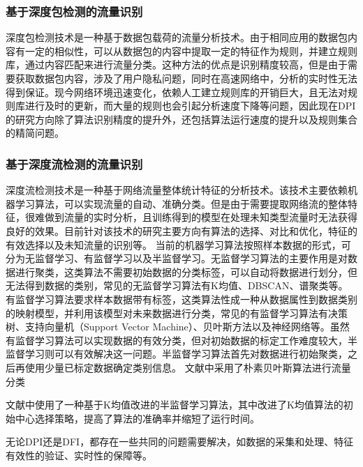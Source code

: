 \documentclass[a4papper]{article}
\begin{document}
\subsubsection{基于深度包检测的流量识别}
\par\setlength{\parindent}{2em} %
深度包检测技术是一种基于数据包载荷的流量分析技术。由于相同应用的数据包内容有一定的相似性，可以从数据包的内容中提取一定的特征作为规则，并建立规则库，通过内容匹配来进行流量分类。这种方法的优点是识别精度较高，但是由于需要获取数据包内容，涉及了用户隐私问题，同时在高速网络中，分析的实时性无法得到保证。现今网络环境迅速变化，依赖人工建立规则库的开销巨大，且无法对规则库进行及时的更新，而大量的规则也会引起分析速度下降等问题，因此现在DPI的研究方向除了算法识别精度的提升外，还包括算法运行速度的提升以及规则集合的精简问题。
\subsubsection{基于深度流检测的流量识别}
\par\setlength{\parindent}{2em} %
深度流检测技术是一种基于网络流量整体统计特征的分析技术。该技术主要依赖机器学习算法，可以实现流量的自动、准确分类。但是由于需要提取网络流的整体特征，很难做到流量的实时分析，且训练得到的模型在处理未知类型流量时无法获得良好的效果。目前针对该技术的研究主要方向有算法的选择、对比和优化，特征的有效选择以及未知流量的识别等。
当前的机器学习算法按照样本数据的形式，可分为无监督学习、有监督学习以及半监督学习。无监督学习算法的主要作用是对数据进行聚类，这类算法不需要初始数据的分类标签，可以自动将数据进行划分，但无法得到数据的类别，常见的无监督学习算法有K均值、DBSCAN、谱聚类等。有监督学习算法要求样本数据带有标签，这类算法性成一种从数据属性到数据类别的映射模型，并利用该模型对未来数据进行分类，常见的有监督学习算法有决策树、支持向量机（Support Vector Machine）、贝叶斯方法以及神经网络等。虽然有监督学习算法可以实现数据的有效分类，但对初始数据的标定工作难度较大，半监督学习则可以有效解决这一问题。半监督学习算法首先对数据进行初始聚类，之后再使用少量已标定数据确定类别信息。
文献\cite{Moore:2005:ITC:1071690.1064220}中采用了朴素贝叶斯算法进行流量分类
\par\setlength{\parindent}{2em} %
文献\cite{林冠洲2011网络流量识别关键技术研究}中使用了一种基于K均值改进的半监督学习算法，其中改进了K均值算法的初始中心选择策略，提高了算法的准确率并缩短了运行时间。
\par\setlength{\parindent}{2em} %
无论DPI还是DFI，都存在一些共同的问题需要解决，如数据的采集和处理、特征有效性的验证、实时性的保障等。
\end{document}
